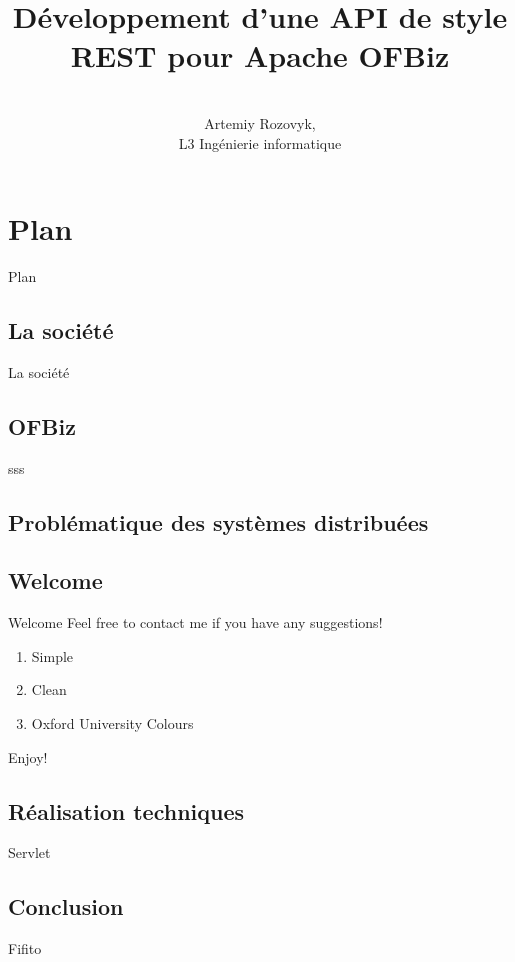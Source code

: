 \documentclass{beamer}
\title{Développement d’une API de style REST pour Apache
	OFBiz}
\author{\\
	Artemiy Rozovyk,\\ L3 Ingénierie informatique}
\institute{Université d'Orléans}
\date{} %
\begin{document}
{ 
\frame{\titlepage}}

\section{Plan}\begin{frame}{Plan}\tableofcontents\end{frame}

\subsection{La société}
    \begin{frame}{La société}
     
  \end{frame}




\subsection{OFBiz}
    \begin{frame}[plain]
      sss
  \end{frame}
  
  

\subsection{Problématique des systèmes distribuées }

\subsection{Welcome}
\begin{frame}{Welcome}
Feel free to contact me if you have any suggestions! \href{https://github.com/CEPav}{\faGithub}

\begin{enumerate}
	\item Simple
	\item Clean
	\item Oxford University Colours
\end{enumerate}
\vspace{1cm}
\begin{center}
	Enjoy! \faSmileO
\end{center}
\end{frame}

\subsection{Réalisation techniques}
Servlet

\subsection{Conclusion}
Fifito
\end{document}
